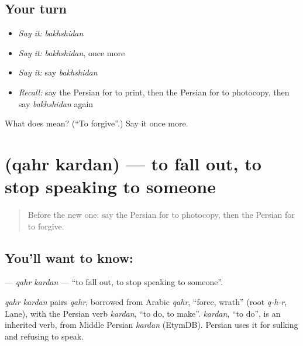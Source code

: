 \subsection*{Your turn}
\begin{itemize}
\raggedright
  \item \emph{Say it:} \emph{bakhshidan}
  \item \emph{Say it:} \emph{bakhshidan}, once more
  \item \emph{Say it:} say \emph{bakhshidan}
  \item \emph{Recall:} say the Persian for to print, then the Persian for to photocopy, then say \emph{bakhshidan} again
\end{itemize}

\begin{tcolorbox}[breakable,colback=teal!4,colframe=teal!35!black,title={Before you move on}]
What does  mean? (\textquotedblleft{}To forgive\textquotedblright{}.) Say it once more.
\end{tcolorbox}
\section[\texorpdfstring{\fa{قهر} \fa{کردن} (qahr kardan)}{قهر کردن (qahr kardan)}]{  (qahr kardan) — to fall out, to stop speaking to someone}

\label{lesson:FA-C221-qahr-kardan}



\begin{quote}
Before the new one: say the Persian for to photocopy, then the Persian for to forgive.
\end{quote}

\subsection*{You'll want to know:  }
\textbf{ } — \emph{qahr kardan} — \textquotedblleft{}to fall out, to stop speaking to someone\textquotedblright{}.

\begin{cousinweb}
\emph{qahr kardan} pairs \emph{qahr}, borrowed from Arabic \emph{qahr}, \textquotedblleft{}force, wrath\textquotedblright{} (root \emph{q-h-r}, Lane), with the Persian verb \emph{kardan}, \textquotedblleft{}to do, to make\textquotedblright{}. \emph{kardan}, \textquotedblleft{}to do\textquotedblright{}, is an inherited verb, from Middle Persian \emph{kardan} (EtymDB). Persian uses it for sulking and refusing to speak.
\end{cousinweb}

